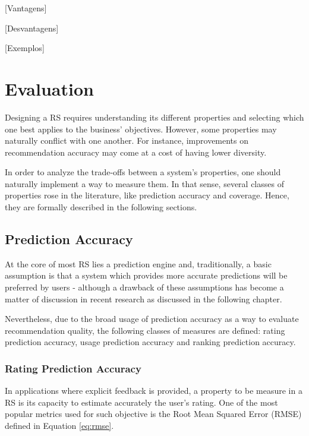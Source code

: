   [Vantagens]

  [Desvantagens]

  [Exemplos]




\section{Evaluation}



Designing a RS requires understanding its different properties and selecting which one best applies to the business' objectives. However, some properties may naturally conflict with one another. For instance, improvements on recommendation accuracy may come at a cost of having lower diversity. 

In order to analyze the trade-offs between a system's properties, one should naturally implement a way to measure them. In that sense, several classes of properties rose in the literature, like prediction accuracy and coverage. Hence, they are formally described in the following sections. 

\subsection{Prediction Accuracy}

At the core of most RS lies a prediction engine and, traditionally, a basic assumption is that a system which provides more accurate predictions will be preferred by users - although a drawback of these assumptions has become a matter of discussion in recent research as discussed in the following chapter. 

Nevertheless, due to the broad usage of prediction accuracy as a way to evaluate recommendation quality, the following classes of measures are defined: rating prediction accuracy, usage prediction accuracy and ranking prediction accuracy.

\subsubsection{Rating Prediction Accuracy}

In applications where explicit feedback is provided, a property to be measure in a RS is its capacity to estimate accurately the user's rating. One of the most popular metrics used for such objective is the Root Mean Squared Error (RMSE)  defined in Equation \ref{eq:rmse}.

